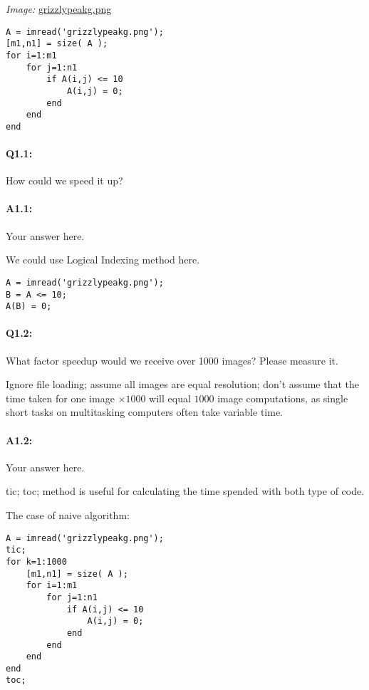 \documentclass[11pt]{article}
\begin{document}
\emph{Image:} \href{grizzlypeakg.png}{grizzlypeakg.png}

\begin{lstlisting}[style=Matlab-editor]
A = imread('grizzlypeakg.png');
[m1,n1] = size( A );
for i=1:m1
    for j=1:n1
        if A(i,j) <= 10
            A(i,j) = 0;
        end
    end
end
\end{lstlisting}

\paragraph{Q1.1:} How could we speed it up?

\paragraph{A1.1:} Your answer here.

We could use Logical Indexing method here.

\begin{lstlisting}[style=Matlab-editor]
A = imread('grizzlypeakg.png');
B = A <= 10;
A(B) = 0;
\end{lstlisting}



\pagebreak
\paragraph{Q1.2:} What factor speedup would we receive over 1000 images? Please measure it.

Ignore file loading; assume all images are equal resolution; don't assume that the time taken for one image $\times1000$ will equal $1000$ image computations, as single short tasks on multitasking computers often take variable time.

\paragraph{A1.2:} Your answer here.

tic; toc; method is useful for calculating the time spended with both type of code.

The case of naive algorithm:
\begin{lstlisting}[style=Matlab-editor]
A = imread('grizzlypeakg.png');
tic;
for k=1:1000
    [m1,n1] = size( A );
    for i=1:m1
        for j=1:n1
            if A(i,j) <= 10
                A(i,j) = 0;
            end
        end
    end
end
toc;
\end{lstlisting}
\end{document}
